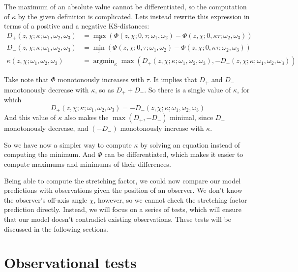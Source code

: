 \documentclass{article}
\DeclareMathOperator*{\argmin}{argmin}
\begin{document}
The maximum of an absolute value cannot be differentiated, so the computation of $\kappa$ by the given definition is complicated. Lets instead rewrite this expression in terms of a positive and a negative KS-distances:
\begin{align*}
D_+\left(z,\chi; \kappa; \omega_1, \omega_2, \omega_3\right) &= \max_\tau\left( \Phi\left(z,\chi; 0,\tau; \omega_1,\omega_2\right) - \Phi\left( z,\chi; 0,\kappa \tau; \omega_2,\omega_3 \right) \right) \\
D_-\left(z,\chi; \kappa; \omega_1, \omega_2, \omega_3\right) &= \min_\tau\left( \Phi\left(z,\chi; 0,\tau; \omega_1,\omega_2\right) - \Phi\left( z,\chi; 0,\kappa \tau; \omega_2,\omega_3 \right) \right) \\
\kappa\left(z,\chi; \omega_1, \omega_2, \omega_3\right) &= \argmin_\kappa \max\left(D_+\left(z,\chi; \kappa; \omega_1, \omega_2, \omega_3\right), -D_-\left(z,\chi; \kappa; \omega_1, \omega_2, \omega_3\right)\right)
\end{align*}

Take note that $\Phi$ monotonously increases with $\tau$. It implies that $D_+$ and $D_-$ monotonously decrease with $\kappa$, so as $D_+ + D_-$. So there is a single value of $\kappa$, for which
\begin{equation}
D_+\left(z,\chi; \kappa; \omega_1, \omega_2, \omega_3\right) = -D_-\left(z,\chi; \kappa; \omega_1, \omega_2, \omega_3\right)
\end{equation}
And this value of $\kappa$ also makes the $\max\left({D_+, -D_-}\right)$ minimal, since $D_+$ monotonously decrease, and $\left(-D_-\right)$ monotonously increase with $\kappa$.

So we have now a simpler way to compute $\kappa$ by solving an equation instead of computing the minimum. And $\Phi$ can be differentiated, which makes it easier to compute maximums and minimums of their differences.

Being able to compute the stretching factor, we could now compare our model predictions with observations given the position of an observer. We don't know the observer's off-axis angle $\chi$, however, so we cannot check the stretching factor prediction directly. Instead, we will focus on a series of tests, which will ensure that our model doesn't contradict existing observations. These tests will be discussed in the following sections.


\section{Observational tests}
\label{sec:tests}
\end{document}
